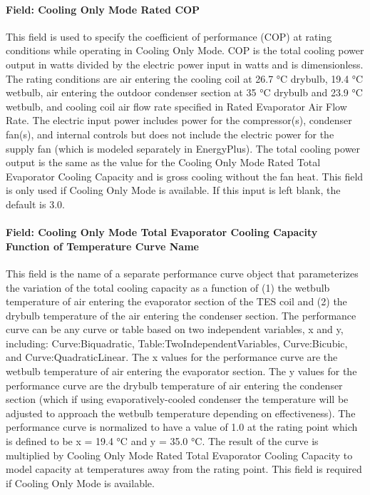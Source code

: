 \paragraph{Field: Cooling Only Mode Rated COP}\label{field-cooling-only-mode-rated-cop}

This field is used to specify the coefficient of performance (COP) at rating conditions while operating in Cooling Only Mode. COP is the total cooling power output in watts divided by the electric power input in watts and is dimensionless. The rating conditions are air entering the cooling coil at 26.7 °C drybulb, 19.4 °C wetbulb, air entering the outdoor condenser section at 35 °C drybulb and 23.9 °C wetbulb, and cooling coil air flow rate specified in Rated Evaporator Air Flow Rate. The electric input power includes power for the compressor(s), condenser fan(s), and internal controls but does not include the electric power for the supply fan (which is modeled separately in EnergyPlus). The total cooling power output is the same as the value for the Cooling Only Mode Rated Total Evaporator Cooling Capacity and is gross cooling without the fan heat. This field is only used if Cooling Only Mode is available. If this input is left blank, the default is 3.0.

\paragraph{Field: Cooling Only Mode Total Evaporator Cooling Capacity Function of Temperature Curve Name}\label{field-cooling-only-mode-total-evaporator-cooling-capacity-function-of-temperature-curve-name}

This field is the name of a separate performance curve object that parameterizes the variation of the total cooling capacity as a function of (1) the wetbulb temperature of air entering the evaporator section of the TES coil and (2) the drybulb temperature of the air entering the condenser section. The performance curve can be any curve or table based on two independent variables, x and y, including: Curve:Biquadratic, Table:TwoIndependentVariables, Curve:Bicubic, and Curve:QuadraticLinear. The x values for the performance curve are the wetbulb temperature of air entering the evaporator section. The y values for the performance curve are the drybulb temperature of air entering the condenser section (which if using evaporatively-cooled condenser the temperature will be adjusted to approach the wetbulb temperature depending on effectiveness). The performance curve is normalized to have a value of 1.0 at the rating point which is defined to be x = 19.4 °C and y = 35.0 °C. The result of the curve is multiplied by Cooling Only Mode Rated Total Evaporator Cooling Capacity to model capacity at temperatures away from the rating point. This field is required if Cooling Only Mode is available.

